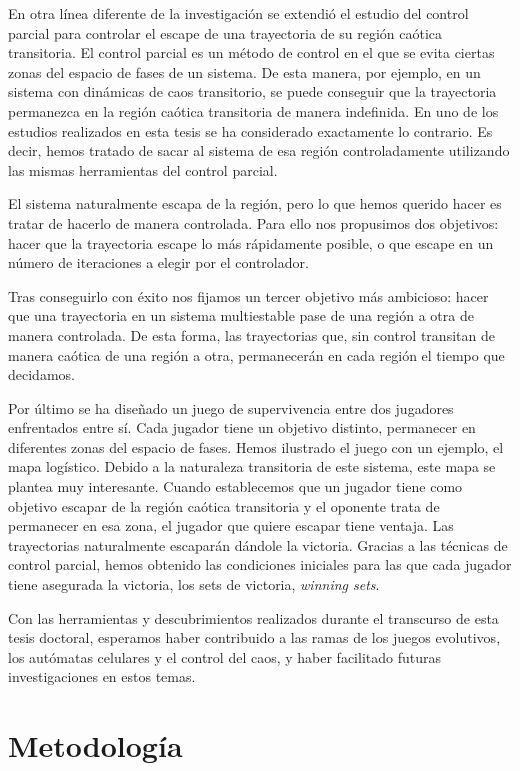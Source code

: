 En otra línea diferente de la investigación se extendió el estudio del control parcial para controlar el escape de una trayectoria de su región caótica transitoria. El control parcial es un método de control en el que se evita ciertas zonas del espacio de fases de un sistema. De esta manera, por ejemplo, en un sistema con dinámicas de caos transitorio, se puede conseguir que la trayectoria permanezca en la región caótica transitoria de manera indefinida. En uno de los estudios realizados en esta tesis se ha considerado exactamente lo contrario. Es decir, hemos tratado de sacar al sistema de esa región controladamente utilizando las mismas herramientas del control parcial.

El sistema naturalmente escapa de la región, pero lo que hemos querido hacer es tratar de hacerlo de manera controlada. Para ello nos propusimos dos objetivos: hacer que la trayectoria escape lo más rápidamente posible, o que escape en un número de iteraciones a elegir por el controlador. 

Tras conseguirlo con éxito nos fijamos un tercer objetivo más ambicioso: hacer que una trayectoria en un sistema multiestable pase de una región a otra de manera controlada. De esta forma, las trayectorias que, sin control transitan de manera caótica de una región a otra, permanecerán en cada región el tiempo que decidamos. 

Por último se ha diseñado un juego de supervivencia entre dos jugadores enfrentados entre sí. Cada jugador tiene un objetivo distinto, permanecer en diferentes zonas del espacio de fases. Hemos ilustrado el juego con un ejemplo, el mapa logístico. Debido a la naturaleza transitoria de este sistema, este mapa se plantea muy interesante. Cuando establecemos que un jugador tiene como objetivo escapar de la región caótica transitoria y el oponente trata de permanecer en esa zona, el jugador que quiere escapar tiene ventaja. Las trayectorias naturalmente escaparán dándole la victoria. Gracias a las técnicas de control parcial, hemos obtenido las condiciones iniciales para las que cada jugador tiene asegurada la victoria, los sets de victoria, \textit{winning sets}. 

Con las herramientas y descubrimientos realizados durante el transcurso de esta tesis doctoral, esperamos haber contribuido a las ramas de los juegos evolutivos, los autómatas celulares y el control del caos, y haber facilitado futuras investigaciones en estos temas.

\section{Metodología}

